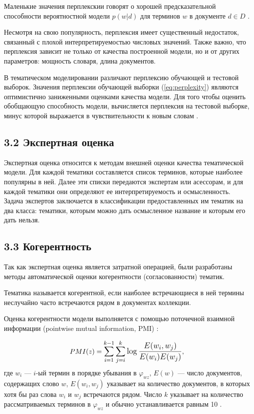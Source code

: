 \documentclass[a4paper]{report}
\begin{document}
	Маленькие значения перплекскии говорят о хорошей предсказательной способности вероятностной модели $p(w|d)$ для терминов $w$ в документе $d \in D$ \cite{bib:Heinrich}.
	
	Несмотря на свою популярность, перплексия имеет существенный недостаток, связанный с плохой интерпретируемостью числовых значений. Также важно, что перплексия зависит не только от качества построенной модели, но и от других параметров: мощность словаря, длина документов.
	
	В тематическом моделировании различают перплексию обучающей и тестовой выборок.
	Значения перплексии обучающей выборки (\ref{eq:perplexity}) являются оптимистично заниженными оценками качества модели. 
	Для того чтобы оценить обобщающую способность модели, вычисляется перплексия на тестовой выборке, минус которой выражается в чувствительности к новым словам \cite{bib:Voron1}.
	
	\subsection{3.2 Экспертная оценка}
	Экспертная оценка относится к методам внешней оценки качества тематической модели. Для каждой тематики составляется список терминов, которые наиболее популярны в ней.  Далее эти списки передаются экспертам или асессорам, и для каждой тематики они определяют ее интерпретируемость и осмысленность. Задача экспертов заключается в классификации предоставленных им тематик на два класса: тематики, которым можно дать осмысленное название и которым его дать нельзя.
	
	\subsection{3.3 Когерентность}
	
	Так как экспертная оценка является затратной операцией, были разработаны методы автоматической оценки когерентности (согласованности) тематик.
	
	Тематика называется когерентной, если наиболее встречающиеся в ней термины неслучайно часто встречаются рядом в документах коллекции.
	
	Оценка когерентности модели выполняется с помощью поточечной взаимной информации (pointwise mutual information, PMI) \cite{bib:Newman}:
	
	\begin{equation}
		PMI(z) = \mathlarger{
			\sum_{i=1}^{k-1} \sum_{j=i}^{k} \log 
			\dfrac
			{E(w_i,w_j)}
			{E(w_i)E(w_j)}
		},
	\label{eq:coherence}
	\end{equation}
	где $w_i$ --- $i$-ый термин в порядке убывания в $\varphi_{wz}$, $E(w)$ --- число документов, содержащих слово $w$, $E(w_i,w_j)$ указывает на количество документов, в которых хотя бы раз слова $w_i$ и $w_j$ встречаются рядом. Число $k$ указывает на количество рассматриваемых терминов в $\varphi_{wz}$ и обычно устанавливается равным 10 \cite{bib:Voron1}.
	
\end{document}
